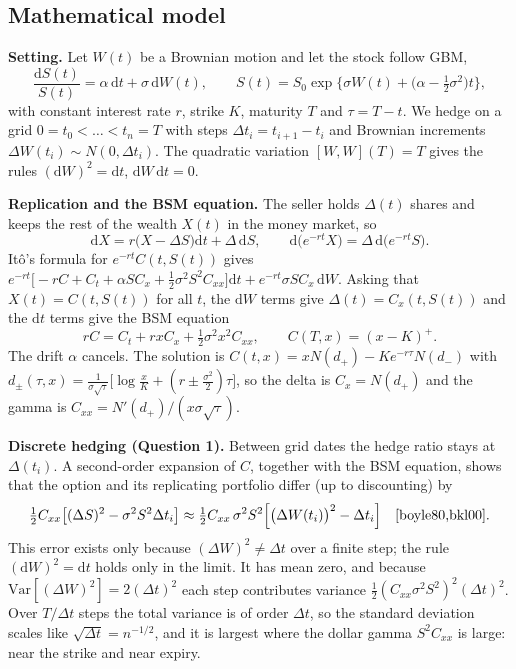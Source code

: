 \documentclass[11pt,a4paper]{article}
\newcommand{\dd}{\,\mathrm{d}}
\begin{document}
\subsection{Mathematical model}

\textbf{Setting.} Let $W(t)$ be a Brownian motion and let the stock follow GBM,
\[
\frac{\mathrm{d}S(t)}{S(t)} = \alpha\dd t + \sigma\dd W(t),\qquad S(t) = S_0\exp\Big\{\sigma W(t) + \big(\alpha - \tfrac12\sigma^2\big)t\Big\},
\]
with constant interest rate $r$, strike $K$, maturity $T$ and $\tau = T-t$. We hedge on a grid $0 = t_0 < \dots < t_n = T$ with steps $\Delta t_i = t_{i+1}-t_i$ and Brownian increments $\Delta W(t_i)\sim N(0,\Delta t_i)$. The quadratic variation $[W,W](T)=T$ gives the rules $(\mathrm{d}W)^2=\mathrm{d}t$, $\mathrm{d}W\,\mathrm{d}t=0$.

\textbf{Replication and the BSM equation.} The seller holds $\Delta(t)$ shares and keeps the rest of the wealth $X(t)$ in the money market, so
\[
\mathrm{d}X = r\big(X - \Delta S\big)\mathrm{d}t + \Delta\,\mathrm{d}S,\qquad \mathrm{d}\big(e^{-rt}X\big) = \Delta\,\mathrm{d}\big(e^{-rt}S\big).
\]
It\^o's formula for $e^{-rt}C(t,S(t))$ gives $e^{-rt}\big[-rC + C_t + \alpha SC_x + \tfrac12\sigma^2S^2C_{xx}\big]\mathrm{d}t + e^{-rt}\sigma SC_x\,\mathrm{d}W$. Asking that $X(t)=C(t,S(t))$ for all $t$, the $\mathrm{d}W$ terms give $\Delta(t)=C_x(t,S(t))$ and the $\mathrm{d}t$ terms give the BSM equation \cite{shreve2}
\[
rC = C_t + rxC_x + \tfrac12\sigma^2x^2C_{xx},\qquad C(T,x)=(x-K)^+ .
\]
The drift $\alpha$ cancels. The solution is $C(t,x)=xN(d_+)-Ke^{-r\tau}N(d_-)$ with $d_\pm(\tau,x)=\frac{1}{\sigma\sqrt\tau}\big[\log\frac{x}{K}+(r\pm\frac{\sigma^2}{2})\tau\big]$, so the delta is $C_x=N(d_+)$ and the gamma is $C_{xx}=N'(d_+)/(x\sigma\sqrt\tau)$.

\textbf{Discrete hedging (Question 1).} Between grid dates the hedge ratio stays at $\Delta(t_i)$. A second-order expansion of $C$, together with the BSM equation, shows that the option and its replicating portfolio differ (up to discounting) by
\[
\tfrac12 C_{xx}\big[(\Delta S)^2 - \sigma^2S^2\Delta t_i\big]\approx \tfrac12 C_{xx}\,\sigma^2S^2\Big[\big(\Delta W(t_i)\big)^2-\Delta t_i\Big]\quad\text{\cite{boyle80,bkl00}}.
\]
This error exists only because $(\Delta W)^2\neq\Delta t$ over a finite step; the rule $(\mathrm{d}W)^2=\mathrm{d}t$ holds only in the limit. It has mean zero, and because $\mathrm{Var}[(\Delta W)^2]=2(\Delta t)^2$ each step contributes variance $\tfrac12(C_{xx}\sigma^2S^2)^2(\Delta t)^2$. Over $T/\Delta t$ steps the total variance is of order $\Delta t$, so the standard deviation scales like $\sqrt{\Delta t}=n^{-1/2}$, and it is largest where the dollar gamma $S^2C_{xx}$ is large: near the strike and near expiry.
\end{document}
